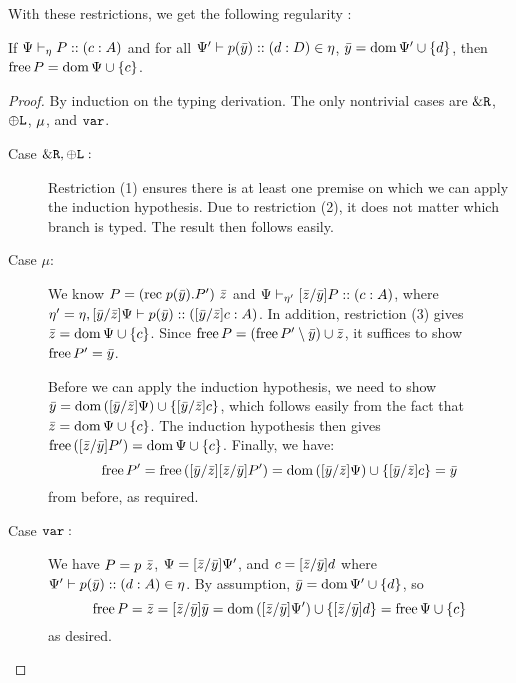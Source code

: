 With these restrictions, we get the following regularity :
\begin{theorem}
  \label{refinements:regularity}
  If $\typeRecDJ P c A$ and for all $\typeD {\ctx'} {\tvar p {\tvector y}} d D \in \recCtx$, $\tvector y = \dom{\ctx'} \cup \set d$, then $\free P = \dom\ctx \cup \set c$.
\end{theorem}
\begin{proof}
  By induction on the typing derivation. The only nontrivial cases are $\external\Right$, $\internal\Left$, $\rec$, and $\procVar$.
  \begin{description}
    \item[Case $\external\Right, \internal\Left :$] Restriction (1) ensures there is at least one premise on which we can apply the induction hypothesis. Due to restriction (2), it does not matter which branch is typed. The result then follows easily.

    \item[Case $\mu :$] We know $P = \tapp {\parens*{ \trec p {\tvector y} {P'}}} {\tvector z}$ and $\typeRecD \ctx {\recCtx'} {\subst {\tvector z} {\tvector y} P} c A$, where $\recCtx' = \recCtx, \typeD {\subst {\tvector y} {\tvector z} \ctx} {\tvar p {\tvector y}} {\subst {\tvector y} {\tvector z} c} A$. In addition, restriction (3) gives $\tvector z = \dom\ctx \cup \set c$. Since $\free P = \parens*{\free {P'} \setminus {\tvector y}} \cup \tvector z$, it suffices to show $\free {P'} = \tvector y$.

    Before we can apply the induction hypothesis, we need to show $\tvector y = \dom{\parens{\subst {\tvector y} {\tvector z} \ctx}} \cup \set {\subst {\tvector y} {\tvector z} c}$, which follows easily from the fact that $\tvector z = \dom\ctx \cup \set c$. The induction hypothesis then gives $\free{\parens{\subst {\tvector z} {\tvector y} {P'}}} = \dom\ctx \cup \set c$. Finally, we have:
    $$ \free{P'}
     = \free{\parens{\subst {\tvector y} {\tvector z}{\subst {\tvector z} {\tvector y} {P'}}}}
     = \dom{\parens{\subst {\tvector y} {\tvector z} \ctx}} \cup \set {\subst {\tvector y} {\tvector z} c}
     = \tvector y
    $$
    from before, as required.

    \item[Case $\procVar :$] We have $P = \tapp p {\tvector z}$, $\ctx = \subst {\tvector z} {\tvector y} {\ctx'}$, and $c = \subst {\tvector z} {\tvector y} d$ where $\typeD {\ctx'} {\tvar p {\tvector y}} d A \in \recCtx$. By assumption, $\tvector y = \dom{\ctx'} \cup \set d$, so
  $$ \free P
   = \tvector z
   = \subst {\tvector z} {\tvector y} {\tvector y}
   = \dom{\parens{\subst {\tvector z} {\tvector y} {\ctx'}}} \cup \set {\subst {\tvector z} {\tvector y} d}
   = \free\ctx \cup \set c
  $$
  as desired.
  \end{description}
\end{proof}

